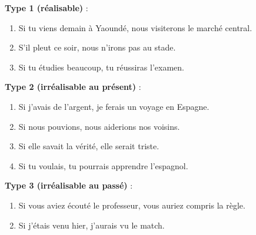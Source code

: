 \documentclass[11pt]{article}
\begin{document}
\begin{exercice}
\textbf{Type 1 (réalisable)} :
\begin{enumerate}
\item Si tu viens demain à Yaoundé, nous visiterons le marché central.
\item S'il pleut ce soir, nous n'irons pas au stade.
\item Si tu étudies beaucoup, tu réussiras l'examen.
\end{enumerate}

\textbf{Type 2 (irréalisable au présent)} :
\begin{enumerate}
\item Si j'avais de l'argent, je ferais un voyage en Espagne.
\item Si nous pouvions, nous aiderions nos voisins.
\item Si elle savait la vérité, elle serait triste.
\item Si tu voulais, tu pourrais apprendre l'espagnol.
\end{enumerate}

\textbf{Type 3 (irréalisable au passé)} :
\begin{enumerate}
\item Si vous aviez écouté le professeur, vous auriez compris la règle.
\item Si j'étais venu hier, j'aurais vu le match.
\end{enumerate}
\end{exercice}
\end{document}
